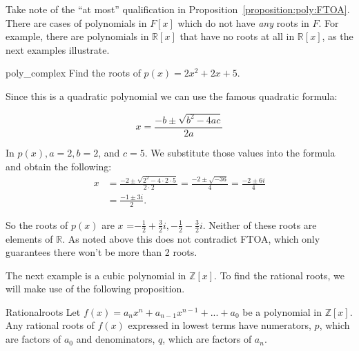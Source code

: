 
Take note of the ``at most'' qualification in Proposition~\ref{proposition:poly:FTOA}. There are cases of polynomials in $F[x]$ which do not have  \emph{any} roots in $F$. For example, there are polynomials in $\mathbb{R}[x]$ that have no roots at all in $\mathbb{R}[x]$, as the next examples illustrate.

\begin{example}{poly_complex} 
Find the roots of $p(x)=2x^2+2x+5$.

Since this is a quadratic polynomial we can use the famous quadratic formula:

$$x=\frac {-b \pm \sqrt{b^2-4ac}}{2a}$$

In $p(x), a=2, b=2$, and $c=5.$ We substitute those values into the formula and obtain the following:
\begin{align*}
x&=\frac {-2 \pm \sqrt{2^2-4\cdot 2\cdot 5}}{2\cdot 2}=\frac {-2 \pm \sqrt{-36}}{4}=\frac {-2 \pm 6i}{4}\\
&=\frac {-1 \pm 3i}{2}.
\end{align*}

So the roots of $p(x)$ are $x$ ={$-\frac{1}{2}+\frac{3}{2}i, -\frac{1}{2}-\frac{3}{2}i$}. Neither of these roots are elements of ${\mathbb R}$. As noted above this does not contradict FTOA, which only guarantees there won't be more than 2 roots.
\end{example}

The next example is a cubic polynomial in $\mathbb{Z}[x]$. To find the rational roots, we will make use of the following proposition.

\begin{prop}{Rationalroots}
Let $f(x) = a_{n}x^n+a_{n-1}x^{n-1}+...+a_{0}$ be a polynomial in $\mathbb{Z}[x]$. Any rational roots of $f(x)$ expressed in lowest terms have numerators, $p$, which are factors of $a_{0}$ and denominators, $q$, which are factors of $a_{n}$.
\end {prop}

